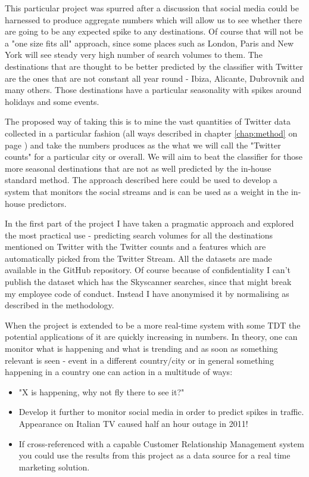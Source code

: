 \documentclass[minf,frontabs,twoside,singlespacing,parskip]{infthesis}
\begin{document}
This particular project was spurred after a discussion that social media could be harnessed to produce aggregate numbers which will allow us to see whether there are going to be any expected spike to any destinations. Of course that will not be a "one size fits all" approach, since some places such as London, Paris and New York will see steady very high number of search volumes to them. The destinations that are thought to be better predicted by the classifier with Twitter are the ones that are not constant all year round - Ibiza, Alicante, Dubrovnik and many others. Those destinations have a particular seasonality with spikes around holidays and some events. 


The proposed way of taking this is to mine the vast quantities of Twitter data collected in a particular fashion (all ways described in chapter \ref{chap:method} on page \pageref{chap:method}) and take the numbers produces as the what we will call the "Twitter counts" for a particular city or overall. We will aim to beat the classifier for those more seasonal destinations that are not as well predicted by the in-house standard method. The approach described here could be used to develop a system that monitors the social streams and is can be used as a weight in the in-house predictors.


In the first part of the project I have taken a pragmatic approach and explored the most practical use - predicting search volumes for all the destinations mentioned on Twitter with the Twitter counts and a features which are automatically picked from the Twitter Stream. All the datasets are made available in the GitHub repository. \cite{code} Of course because of confidentiality I can't publish the dataset which has the Skyscanner searches, since that might break my employee code of conduct. Instead I have anonymised it by normalising as described in the methodology. 


When the project is extended to be a more real-time system with some TDT the potential applications of it are quickly increasing in numbers. In theory, one can monitor what is happening and what is trending and as soon as something relevant is seen - event in a different country/city or in general something happening in a country one can action in a multitude of ways:
\begin{itemize}
\item "X is happening, why not fly there to see it?"
\item Develop it further to monitor social media in order to predict spikes in traffic. Appearance on Italian TV caused half an hour outage in 2011!
\item If cross-referenced with a capable Customer Relationship Management system you could use the results from this project as a data source for a real time marketing solution. 
\end{itemize}
\end{document}
